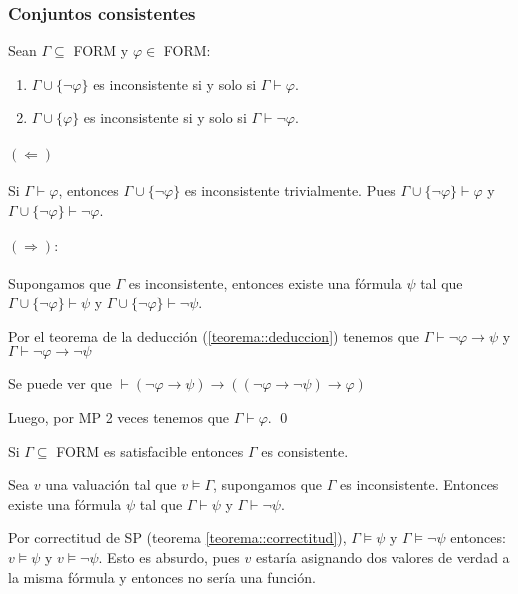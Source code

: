 \subsubsection{Conjuntos consistentes}
\begin{proposicion}\label{proposicion::inconsistentes}
	Sean $\Gamma\subseteq$ FORM y $\varphi\in$ FORM:
	\begin{enumerate}
		\item $\Gamma\cup\{\lnot\varphi\}$ es inconsistente si y solo si $\Gamma\vdash\varphi$.		
		\item $\Gamma\cup\{\varphi\}$ es inconsistente si y solo si $\Gamma\vdash\lnot\varphi$.
	\end{enumerate}
\end{proposicion}

\begin{demo}
	\paragraph{$\bm{(\Leftarrow)}$} Si $\Gamma\vdash\varphi$, entonces $\Gamma\cup\{\lnot\varphi\}$ es inconsistente trivialmente. Pues $\Gamma\cup\{\lnot\varphi\}\vdash\varphi$ y \\ $\Gamma\cup\{\lnot\varphi\}\vdash\lnot\varphi$.
	
	\paragraph{$\bm{(\Rightarrow):}$} Supongamos que $\Gamma$ es inconsistente, entonces existe una fórmula $\psi$ tal que $\Gamma\cup\{\lnot\varphi\}\vdash\psi$ y $\Gamma\cup\{\lnot\varphi\}\vdash\lnot\psi$.
	
	Por el teorema de la deducción (\ref{teorema::deduccion}) tenemos que $\Gamma\vdash\lnot\varphi\to\psi$ y $\Gamma\vdash\lnot\varphi\to\lnot\psi$
	
	 Se puede ver que $\vdash (\lnot\varphi\to\psi)\to((\lnot\varphi\to\lnot\psi)\to\varphi)$

	Luego, por MP 2 veces tenemos que $\Gamma\vdash\varphi$. \qed
\end{demo}

\begin{teorema}\label{teorema::SatisfacibleEsConsistente}
	Si $\Gamma\subseteq$ FORM es satisfacible entonces $\Gamma$ es consistente.
\end{teorema}

\begin{demo}
Sea $v$ una valuación tal que $v\vDash\Gamma$, supongamos que $\Gamma$ es inconsistente. Entonces existe una fórmula $\psi$ tal que $\Gamma\vdash\psi$ y $\Gamma\vdash\lnot\psi$.

Por correctitud de SP (teorema \ref{teorema::correctitud}), $\Gamma\vDash\psi$ y $\Gamma\vDash\lnot\psi$ entonces: $v\vDash\psi$ y $v\vDash\lnot\psi$. Esto es absurdo, pues $v$ estaría asignando dos valores de verdad a la misma fórmula y entonces no sería una función.
\end{demo}

